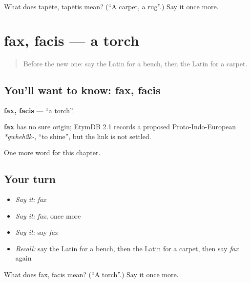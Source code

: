 \begin{tcolorbox}[breakable,colback=teal!4,colframe=teal!35!black,title={Before you move on}]
What does tapēte, tapētis mean? (\textquotedblleft{}A carpet, a rug\textquotedblright{}.) Say it once more.
\end{tcolorbox}
\section[fax, facis]{fax, facis — a torch}

\label{lesson:LA-C139-fax}



\begin{quote}
Before the new one: say the Latin for a bench, then the Latin for a carpet.
\end{quote}

\subsection*{You'll want to know: fax, facis}
\textbf{fax, facis} — \textquotedblleft{}a torch\textquotedblright{}.

\begin{cousinweb}
\textbf{fax} has no sure origin; EtymDB 2.1 records a proposed Proto-Indo-European \emph{*gwheh2k-}, \textquotedblleft{}to shine\textquotedblright{}, but the link is not settled.
\end{cousinweb}

\begin{grammarlens}[title={What you've built}]
One more word for this chapter.
\end{grammarlens}

\subsection*{Your turn}
\begin{itemize}
\raggedright
  \item \emph{Say it:} \emph{fax}
  \item \emph{Say it:} \emph{fax}, once more
  \item \emph{Say it:} say \emph{fax}
  \item \emph{Recall:} say the Latin for a bench, then the Latin for a carpet, then say \emph{fax} again
\end{itemize}

\begin{tcolorbox}[breakable,colback=teal!4,colframe=teal!35!black,title={Before you move on}]
What does fax, facis mean? (\textquotedblleft{}A torch\textquotedblright{}.) Say it once more.
\end{tcolorbox}
